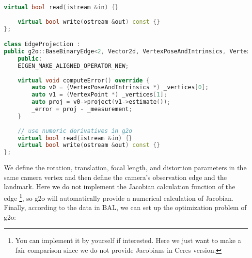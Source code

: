 \begin{lstlisting}[language=c++,caption=slambook2/ch9/bundle_adjustment_g2o.cpp (part)]
	virtual bool read(istream &in) {}
	
	virtual bool write(ostream &out) const {}
};

class EdgeProjection :
public g2o::BaseBinaryEdge<2, Vector2d, VertexPoseAndIntrinsics, VertexPoint> {
	public:
	EIGEN_MAKE_ALIGNED_OPERATOR_NEW;
	
	virtual void computeError() override {
		auto v0 = (VertexPoseAndIntrinsics *) _vertices[0];
		auto v1 = (VertexPoint *) _vertices[1];
		auto proj = v0->project(v1->estimate());
		_error = proj - _measurement;
	}
	
	// use numeric derivatives in g2o
	virtual bool read(istream &in) {}
	virtual bool write(ostream &out) const {}
};
\end{lstlisting}

We define the rotation, translation, focal length, and distortion parameters in the same camera vertex and then define the camera's observation edge and the landmark. Here we do not implement the Jacobian calculation function of the edge \footnote{You can implement it by yourself if interested. Here we just want to make a fair comparison since we do not provide Jacobians in Ceres version.}, so g2o will automatically provide a numerical calculation of Jacobian. Finally, according to the data in BAL, we can set up the optimization problem of g2o:
